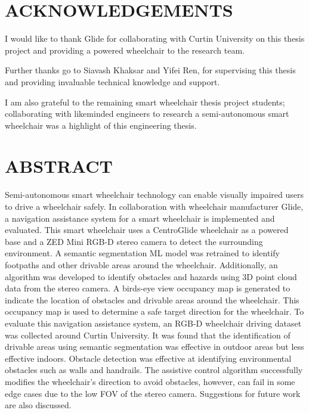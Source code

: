 \documentclass[12pt,twoside]{article}
\begin{document}

\thispagestyle{empty}\null\clearpage


\thispagestyle{empty}\null\clearpage

\section*{ACKNOWLEDGEMENTS}
I would like to thank Glide for collaborating with Curtin University on this thesis project
and providing a powered wheelchair to the research team.

Further thanks go to Siavash Khaksar and Yifei Ren,
for supervising this thesis and providing invaluable technical knowledge and support.

I am also grateful to the remaining smart wheelchair thesis project students;
collaborating with likeminded engineers to research a semi-autonomous smart
wheelchair was a highlight of this engineering thesis.

\cleardoublepage

\section*{ABSTRACT}
Semi-autonomous smart wheelchair technology can enable visually impaired users to drive a wheelchair
safely. In collaboration with wheelchair manufacturer Glide, a navigation assistance system for a
smart wheelchair is implemented and evaluated. This smart wheelchair uses a CentroGlide wheelchair
as a powered base and a ZED Mini RGB-D stereo camera to detect the surrounding environment.
A semantic segmentation ML model was retrained to identify footpaths and other drivable areas around the wheelchair.
Additionally, an algorithm was developed to identify obstacles and hazards using 3D point cloud data from the stereo camera.
A birds-eye view occupancy map is generated to indicate the location of obstacles and drivable areas
around the wheelchair. This occupancy map is used to determine a safe target direction for the wheelchair.
To evaluate this navigation assistance system, an RGB-D wheelchair driving dataset was collected
around Curtin University. It was found that the identification of drivable areas using semantic segmentation was effective in outdoor
areas but less effective indoors. Obstacle detection was effective at identifying environmental obstacles such as
walls and handrails. The assistive control algorithm successfully modifies the wheelchair's direction to avoid obstacles,
however, can fail in some edge cases due to the low FOV of the stereo camera. Suggestions for future work are also discussed.
\cleardoublepage
\end{document}
